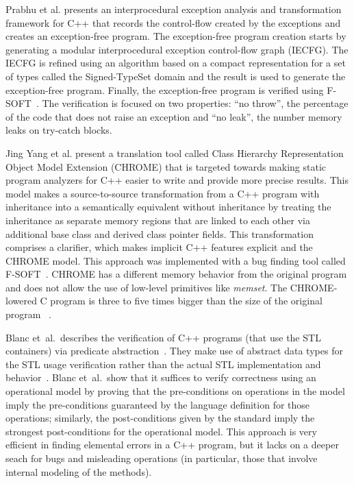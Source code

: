 \documentclass[a4paper]{llncs}
\begin{document}
Prabhu et al. presents an interprocedural exception 
analysis and transformation framework for C++ that 
records the control-flow created by the exceptions 
and creates an exception-free program. The exception-free 
program creation starts by generating a modular interprocedural 
exception control-flow graph (IECFG). The IECFG is refined using 
an algorithm based on a compact representation for a set of types 
called the Signed-TypeSet domain and the result is used 
to generate the exception-free program. Finally, the exception-free 
program is verified using F-SOFT~\cite{Fsoft}. The verification is 
focused on two properties: ``no throw'', the percentage of the code 
that does not raise an exception and ``no leak'', the number memory 
leaks on try-catch blocks.~\cite{PrabhuMBIG11}

Jing Yang et al. present a translation tool called Class Hierarchy 
Representation Object Model Extension (CHROME) that is targeted towards 
making static program analyzers for C++ easier to write and provide 
more precise results. This model makes a source-to-source transformation 
from a C++ program with inheritance into a semantically equivalent without 
inheritance by treating the inheritance as separate memory regions 
that are linked to each other via additional base class and derived class 
pointer fields. This transformation comprises a clarifier, which makes 
implicit C++ features explicit and the CHROME model. This approach was 
implemented with a bug finding tool called F-SOFT~\cite{Fsoft}. CHROME has a 
different memory behavior from the original program and does not allow the use 
of low-level primitives like \textit{memset}. The CHROME-lowered C program is 
three to five times bigger than the size of the original program ~\cite{Yang12}.

Blanc et~al.\ describes the verification of C++ programs (that use the STL containers)
via predicate abstraction~\cite{Blanc07}. They make use of abstract data types for the STL 
usage verification rather than the actual STL implementation and behavior~\cite{Blanc07}. 
Blanc et~al.\ show that it suffices to verify correctness using an operational model 
by proving that the pre-conditions on operations in the model imply the pre-conditions 
guaranteed by the language definition for those operations; similarly, the post-conditions 
given by the standard imply the strongest post-conditions for the operational model. 
This approach is very efficient in finding elemental errors in a C++ program, but it lacks 
on a deeper seach for bugs and misleading operations (in particular, those that involve internal 
modeling of the methods).
\end{document}
